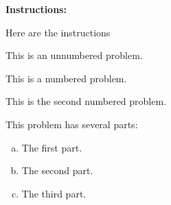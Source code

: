 \documentclass[11pt,letterpaper]{article}
\begin{document}
\textbf{Instructions:} \par \noindent Here are the instructions \pspace


\prob This is an unnumbered problem. \pspace


\problem This is a numbered problem. \vspace{1.5cm}


 This is the second numbered problem. \vfill


\problem This problem has several parts:
	\begin{enumerate}[(a)]
	\item The first part.
	\item The second part. 
	\item The third part. 
	\end{enumerate} \vspace{6cm}
\end{document}
